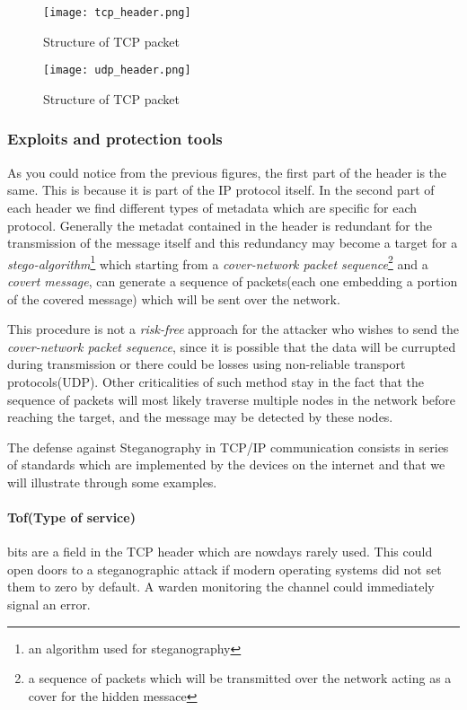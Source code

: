 \documentclass[../../main.tex]{subfiles}
\begin{document}
    \begin{figure}[h]
        \centering
        \caption{Structure of TCP packet}
        \texttt{[image: tcp\_header.png]}
    \end{figure}

    \begin{figure}[h]
        \centering
        \caption{Structure of TCP packet}
        \texttt{[image: udp\_header.png]}
    \end{figure}

    \subsubsection{Exploits and protection tools}

    As you could notice from the previous figures, the first part of the header
    is the same. This is because it is part of the IP protocol itself.
    In the second part of each header we find different types of metadata which
    are specific for each protocol. Generally the metadat contained in the
    header is redundant for the transmission of the message itself and this 
    redundancy may become a target for a \emph{stego-algorithm}\footnote{an
    algorithm used for steganography} which starting from a \emph{cover-network
    packet sequence}\footnote{a sequence of packets which will be transmitted
    over the network acting as a cover for the hidden messace} and a
    \emph{covert message}, can generate a sequence of packets(each one embedding
    a portion of the covered message) which will be sent over the network.

    This procedure is not a \emph{risk-free} approach for the attacker who
    wishes to send the \emph{cover-network packet sequence}, since it is
    possible that the data will be currupted during transmission or there could
    be losses using non-reliable transport protocols(UDP).
    Other criticalities of such method stay in the fact that the sequence of
    packets will most likely traverse multiple nodes in the network before
    reaching the target, and the message may be detected by these nodes.

    The defense against Steganography in TCP/IP communication consists in 
    series of standards which are implemented by the devices on the internet and
    that we will illustrate through some examples.


    \paragraph{Tof(Type of service)} bits are a field in the TCP header which
    are nowdays rarely used. This could open doors to a steganographic attack if
    modern operating systems did not set them to zero by default.
    A warden monitoring the channel could immediately signal an error.
\end{document}
